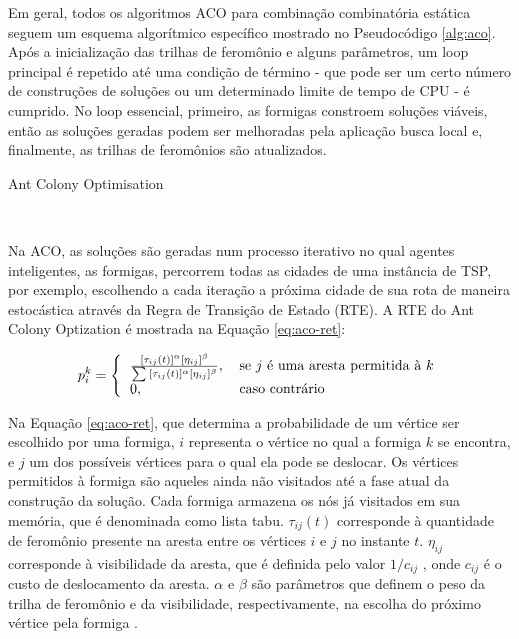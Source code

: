 Em geral, todos os algoritmos ACO para combinação combinatória estática seguem um esquema algorítmico específico mostrado no Pseudocódigo \ref{alg:aco}. Após a inicialização das trilhas de feromônio e alguns parâmetros, um loop principal é repetido até uma condição de término - que pode ser um certo número de construções de soluções ou um determinado limite de tempo de CPU - é cumprido. No loop essencial, primeiro, as formigas constroem soluções viáveis, então as soluções geradas podem ser melhoradas pela aplicação busca local e, finalmente, as trilhas de feromônios são atualizados.

\begin{algorithm}[H]
	\caption{Ant Colony Optimisation}\label{alg:aco}
	\begin{algorithmic}[1]
		\small
        \
	\end{algorithmic}
\end{algorithm}

Na ACO, as soluções são geradas num processo iterativo no qual agentes inteligentes, as formigas, percorrem todas as
cidades de uma instância de TSP, por exemplo, escolhendo a cada iteração a próxima cidade de sua rota de maneira
estocástica através da Regra de Transição de Estado (RTE). A RTE \cite{dorigo1996any} do Ant Colony Optization é mostrada na Equação \ref{eq:aco-ret}:

\begin{equation} \label{eq:aco-ret} 
    p_i^k = \Bigg\{
        \begin{tabular}{ll}
        \(\frac{[\tau_{ij}(t)]^\alpha[\eta_{ij}]^\beta}{\sum{}^{}{[\tau_{ij}(t)]^\alpha[\eta_{ij}]^\beta}}\), & se $j$ é uma aresta permitida à $k$ \\
        0, & caso contrário
        \end{tabular}
\end{equation}

Na Equação \ref{eq:aco-ret}, que determina a probabilidade de um vértice ser escolhido por uma formiga, $i$ representa o vértice no qual a formiga $k$ se encontra, e $j$ um dos possíveis vértices para o qual ela pode se deslocar. Os vértices permitidos à formiga são aqueles ainda não visitados até a fase atual da construção da solução. Cada formiga armazena os nós já visitados em sua memória, que é denominada como lista tabu. $\tau_{ij}(t)$ corresponde à quantidade de feromônio presente na aresta entre os vértices $i$ e $j$ no instante $t$. $\eta_{ij}$ corresponde à visibilidade da aresta, que é definida pelo valor $1/c_{ij}$ , onde $c_{ij}$ é o custo de deslocamento da aresta. $\alpha$ e $\beta$ são parâmetros que definem o peso da trilha de feromônio e da visibilidade, respectivamente, na escolha do próximo vértice pela formiga \cite{dorigo1996any}.


